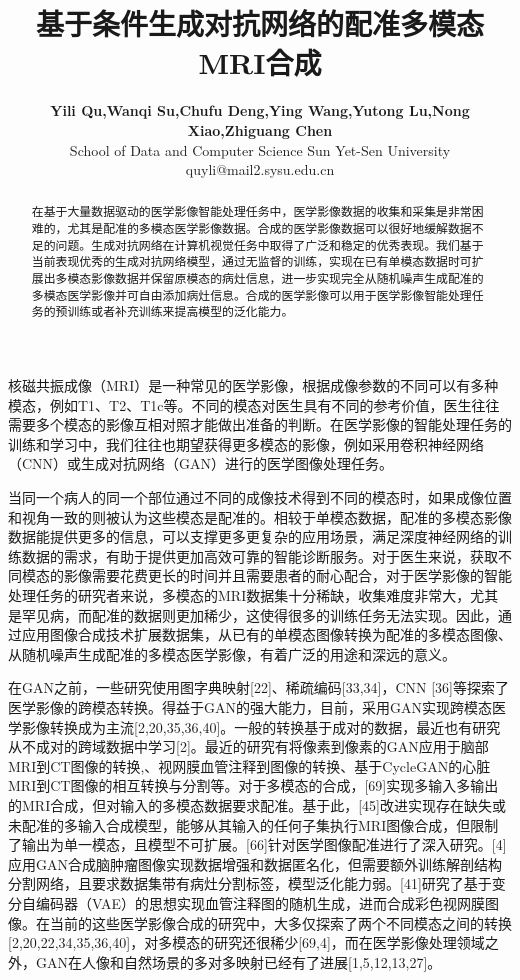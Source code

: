 \documentclass[letterpaper]{article} %
\title{基于条件生成对抗网络的配准多模态MRI合成}
\author{\Large \textbf{Yili Qu,Wanqi Su,Chufu Deng,Ying Wang,Yutong Lu,Nong Xiao,Zhiguang Chen}\\ %
School of Data and Computer Science Sun Yet-Sen University\\	
quyli@mail2.sysu.edu.cn%
}
\begin{document}
\maketitle

\begin{abstract}
在基于大量数据驱动的医学影像智能处理任务中，医学影像数据的收集和采集是非常困难的，尤其是配准的多模态医学影像数据。合成的医学影像数据可以很好地缓解数据不足的问题。生成对抗网络在计算机视觉任务中取得了广泛和稳定的优秀表现。我们基于当前表现优秀的生成对抗网络模型，通过无监督的训练，实现在已有单模态数据时可扩展出多模态影像数据并保留原模态的病灶信息，进一步实现完全从随机噪声生成配准的多模态医学影像并可自由添加病灶信息。合成的医学影像可以用于医学影像智能处理任务的预训练或者补充训练来提高模型的泛化能力。
\end{abstract}

\noindent 
核磁共振成像（MRI）是一种常见的医学影像，根据成像参数的不同可以有多种模态，例如T1、T2、T1c等。不同的模态对医生具有不同的参考价值，医生往往需要多个模态的影像互相对照才能做出准备的判断。在医学影像的智能处理任务的训练和学习中，我们往往也期望获得更多模态的影像，例如采用卷积神经网络（CNN）或生成对抗网络（GAN）进行的医学图像处理任务。

当同一个病人的同一个部位通过不同的成像技术得到不同的模态时，如果成像位置和视角一致的则被认为这些模态是配准的。相较于单模态数据，配准的多模态影像数据能提供更多的信息，可以支撑更多更复杂的应用场景，满足深度神经网络的训练数据的需求，有助于提供更加高效可靠的智能诊断服务。对于医生来说，获取不同模态的影像需要花费更长的时间并且需要患者的耐心配合，对于医学影像的智能处理任务的研究者来说，多模态的MRI数据集十分稀缺，收集难度非常大，尤其是罕见病，而配准的数据则更加稀少，这使得很多的训练任务无法实现。因此，通过应用图像合成技术扩展数据集，从已有的单模态图像转换为配准的多模态图像、从随机噪声生成配准的多模态医学影像，有着广泛的用途和深远的意义。

在GAN之前，一些研究使用图字典映射[22]、稀疏编码[33,34]，CNN [36]等探索了医学影像的跨模态转换。得益于GAN的强大能力，目前，采用GAN实现跨模态医学影像转换成为主流[2,20,35,36,40]。一般的转换基于成对的数据，最近也有研究从不成对的跨域数据中学习[2]。最近的研究有将像素到像素的GAN应用于脑部MRI到CT图像的转换\cite{20nie2017medical},\cite{40kamnitsas2017unsupervised}、视网膜血管注释到图像的转换\cite{41costa2017towards}、基于CycleGAN\cite{6zhu2017unpaired}的心脏MRI到CT图像的相互转换与分割\cite{20nie2017medical}等。对于多模态的合成，[69]实现多输入多输出的MRI合成，但对输入的多模态数据要求配准。基于此，[45]改进实现存在缺失或未配准的多输入合成模型，能够从其输入的任何子集执行MRI图像合成，但限制了输出为单一模态，且模型不可扩展。[66]针对医学图像配准进行了深入研究。[4]应用GAN合成脑肿瘤图像实现数据增强和数据匿名化，但需要额外训练解剖结构分割网络，且要求数据集带有病灶分割标签，模型泛化能力弱。[41]研究了基于变分自编码器（VAE）的思想实现血管注释图的随机生成，进而合成彩色视网膜图像。在当前的这些医学影像合成的研究中，大多仅探索了两个不同模态之间的转换[2,20,22,34,35,36,40]，对多模态的研究还很稀少[69,4]，而在医学影像处理领域之外，GAN在人像和自然场景的多对多映射已经有了进展[1,5,12,13,27]。
\end{document}
